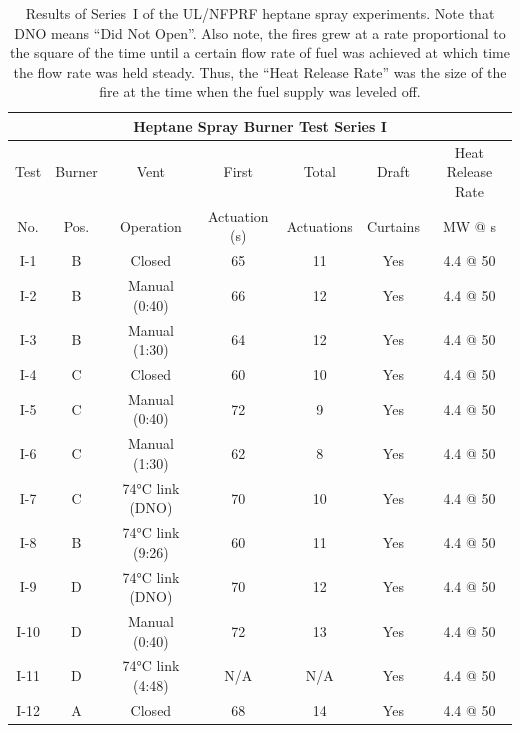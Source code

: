 \begin{table}[h!]
\centering
\caption[Results of the UL/NFPRF heptane spray experiments, Series~I]
{Results of Series~I of the UL/NFPRF heptane spray experiments. Note that DNO means ``Did Not Open''. Also note, the fires grew at a rate proportional to the square of the time until a certain flow rate of fuel was achieved at which time the flow rate was held steady. Thus, the ``Heat Release Rate'' was the size of the fire at the time when the fuel supply was leveled off.}
\label{ULmatrix}
\begin{tabular}{|c||c|c|c|c|c|c|}
\hline
\multicolumn{7}{|c|}{\bf Heptane Spray Burner Test Series I}  \\ \hline \hline
Test & Burner & Vent                    & First         & Total      & Draft    & Heat Release Rate \\
No.  & Pos.   & Operation               & Actuation (s) & Actuations & Curtains & MW @ s \\
\hline \hline
I-1   & B  & Closed                     & 65            & 11        & Yes  & 4.4 @ 50  \\ \hline
I-2   & B  & Manual (0:40)              & 66            & 12        & Yes  & 4.4 @ 50  \\ \hline
I-3   & B  & Manual (1:30)              & 64            & 12        & Yes  & 4.4 @ 50  \\ \hline
I-4   & C  & Closed                     & 60            & 10        & Yes  & 4.4 @ 50  \\ \hline
I-5   & C  & Manual (0:40)              & 72            & 9         & Yes  & 4.4 @ 50  \\ \hline
I-6   & C  & Manual (1:30)              & 62            & 8         & Yes  & 4.4 @ 50  \\ \hline
I-7   & C  & 74\unit{\degreeCelsius} link (DNO)     & 70            & 10        & Yes  & 4.4 @ 50  \\ \hline
I-8   & B  & 74\unit{\degreeCelsius} link (9:26)    & 60            & 11        & Yes  & 4.4 @ 50  \\ \hline
I-9   & D  & 74\unit{\degreeCelsius} link (DNO)     & 70            & 12        & Yes  & 4.4 @ 50  \\ \hline
I-10  & D  & Manual (0:40)              & 72            & 13        & Yes  & 4.4 @ 50  \\ \hline
I-11  & D  & 74\unit{\degreeCelsius} link (4:48)    & N/A           & N/A       & Yes  & 4.4 @ 50  \\ \hline
I-12  & A  & Closed                     & 68            & 14        & Yes  & 4.4 @ 50  \\ \hline

\end{tabular}
\end{table}
